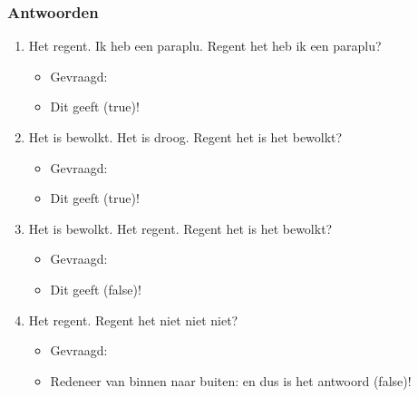 \begin{frame}
\frametitle{Antwoorden}

\begin{enumerate}
  \item Het regent. Ik heb een paraplu. Regent het  heb ik een paraplu?
	\begin{itemize}
	  \item {} Gevraagd: 
	  \item Dit geeft  (true)!
	\end{itemize}
  \item Het is bewolkt. Het is droog. Regent het  is het bewolkt?
	\begin{itemize}
	  \item {} Gevraagd: 
	  \item Dit geeft  (true)!
	\end{itemize}
  \item Het is bewolkt. Het regent. Regent het  is het bewolkt?
	\begin{itemize}
	  \item {} Gevraagd: 
	  \item Dit geeft  (false)!
	\end{itemize}
  \item Het regent. Regent het niet niet niet? 
	\begin{itemize}
	  \item {} Gevraagd: 
	  \item Redeneer van binnen naar buiten:  
	  	en dus is het antwoord  (false)!
	\end{itemize}
\end{enumerate}

\end{frame}

